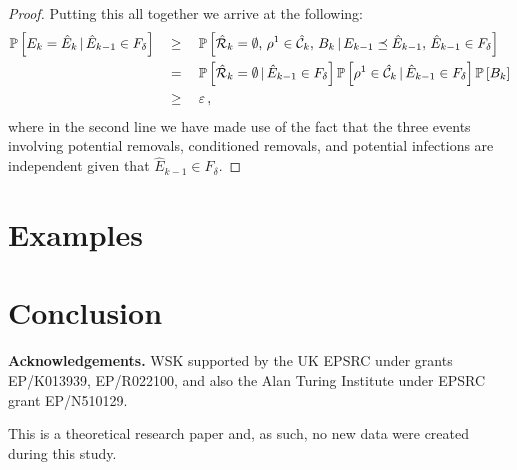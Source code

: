 \documentclass[]{article}
\newcommand{\Conditioned}{\mathcal{C}}
\newcommand{\Epidemic}{E}%
\newcommand{\Removals}{\mathcal{R}}
\newcommand{\ple}{\preceq}
\newcommand{\early}[1]{#1}
\newcommand{\late}[1]{\hat{#1}}
\begin{document}
\begin{proof}
Putting this all together we arrive at the following:
\begin{align*}
	\Prob{\early{\Epidemic}_k = \late{\Epidemic}_k\,|\, \late{\Epidemic}_{k-1}\in F_\delta}  \quad&\ge\quad  \Prob{\late{\Removals}_k=\emptyset,\, \rho^1\in\late{\Conditioned}_k,\, B_k  \,|\,\early\Epidemic_{k-1} \ple \late\Epidemic_{k-1},\, \late{\Epidemic}_{k-1}\in F_\delta}  \\
	&=\quad \Prob{\late{\Removals}_k=\emptyset\,|\, \late{\Epidemic}_{k-1}\in F_\delta} 
	\Prob{\rho^1\in\late{\Conditioned}_k  \,|\, \late{\Epidemic}_{k-1}\in F_\delta} 
	\Prob{B_k} \\
	&\ge\quad \eps \,,
\end{align*}
where in the second line we have made use of the fact that the three events involving potential removals, conditioned removals, and potential infections are independent given that \(\late{\Epidemic}_{k-1} \in F_\delta\).
\end{proof}




 \section{Examples}\label{sec:examples}

 \section{Conclusion}\label{sec:conclusion}
%

\bigskip
\noindent \textbf{Acknowledgements.} 
WSK supported by the UK EPSRC under grants EP/K013939, EP/R022100, and also
the Alan Turing Institute under EPSRC grant EP/N510129.

This is a theoretical research paper and, as such, no new data were created during this study.  
   
   

\appendix
\twocolumn
{}
\setcounter{page}{1}

\TrackingPostamble
 
\end{document}
